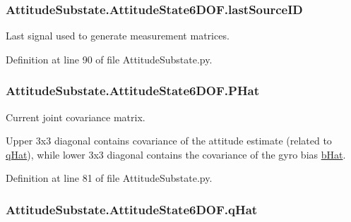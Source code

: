 \subsubsection[{\texorpdfstring{last\+Source\+ID}{lastSourceID}}]{\setlength{\rightskip}{0pt plus 5cm}Attitude\+Substate.\+Attitude\+State6\+D\+O\+F.\+last\+Source\+ID}\hypertarget{classAttitudeSubstate_1_1AttitudeState6DOF_a0161cc024a651de854100014872165af}{}\label{classAttitudeSubstate_1_1AttitudeState6DOF_a0161cc024a651de854100014872165af}


Last signal used to generate measurement matrices. 



Definition at line 90 of file Attitude\+Substate.\+py.

\subsubsection[{\texorpdfstring{P\+Hat}{PHat}}]{\setlength{\rightskip}{0pt plus 5cm}Attitude\+Substate.\+Attitude\+State6\+D\+O\+F.\+P\+Hat}\hypertarget{classAttitudeSubstate_1_1AttitudeState6DOF_a6aac27efa4d5962865f7d3f701c919ab}{}\label{classAttitudeSubstate_1_1AttitudeState6DOF_a6aac27efa4d5962865f7d3f701c919ab}


Current joint covariance matrix. 

Upper 3x3 diagonal contains covariance of the attitude estimate (related to \hyperlink{classAttitudeSubstate_1_1AttitudeState6DOF_a36a58a47280151dd544762d9a1d5c35d}{q\+Hat}), while lower 3x3 diagonal contains the covariance of the gyro bias \hyperlink{classAttitudeSubstate_1_1AttitudeState6DOF_a1b8eff7c89a7a03875dc04263da7ec18}{b\+Hat}. 

Definition at line 81 of file Attitude\+Substate.\+py.

\subsubsection[{\texorpdfstring{q\+Hat}{qHat}}]{\setlength{\rightskip}{0pt plus 5cm}Attitude\+Substate.\+Attitude\+State6\+D\+O\+F.\+q\+Hat}\hypertarget{classAttitudeSubstate_1_1AttitudeState6DOF_a36a58a47280151dd544762d9a1d5c35d}{}\label{classAttitudeSubstate_1_1AttitudeState6DOF_a36a58a47280151dd544762d9a1d5c35d}


